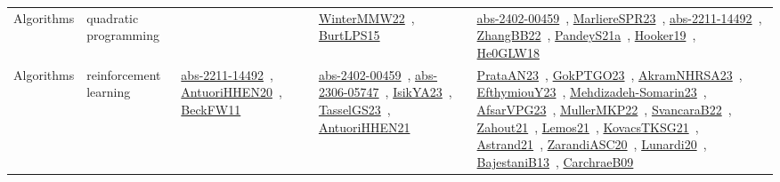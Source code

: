{\begin{longtable}{lp{3cm}>{\raggedright\arraybackslash}p{6cm}>{\raggedright\arraybackslash}p{6cm}>{\raggedright\arraybackslash}p{8cm}}
Algorithms & quadratic programming &  & \href{../works/WinterMMW22.pdf}{WinterMMW22}~\cite{WinterMMW22}, \href{../works/BurtLPS15.pdf}{BurtLPS15}~\cite{BurtLPS15} & \href{../works/abs-2402-00459.pdf}{abs-2402-00459}~\cite{abs-2402-00459}, \href{../works/MarliereSPR23.pdf}{MarliereSPR23}~\cite{MarliereSPR23}, \href{../works/abs-2211-14492.pdf}{abs-2211-14492}~\cite{abs-2211-14492}, \href{../works/ZhangBB22.pdf}{ZhangBB22}~\cite{ZhangBB22}, \href{../works/PandeyS21a.pdf}{PandeyS21a}~\cite{PandeyS21a}, \href{../works/Hooker19.pdf}{Hooker19}~\cite{Hooker19}, \href{../works/He0GLW18.pdf}{He0GLW18}~\cite{He0GLW18}\\
Algorithms & reinforcement learning & \href{../works/abs-2211-14492.pdf}{abs-2211-14492}~\cite{abs-2211-14492}, \href{../works/AntuoriHHEN20.pdf}{AntuoriHHEN20}~\cite{AntuoriHHEN20}, \href{../works/BeckFW11.pdf}{BeckFW11}~\cite{BeckFW11} & \href{../works/abs-2402-00459.pdf}{abs-2402-00459}~\cite{abs-2402-00459}, \href{../works/abs-2306-05747.pdf}{abs-2306-05747}~\cite{abs-2306-05747}, \href{../works/IsikYA23.pdf}{IsikYA23}~\cite{IsikYA23}, \href{../works/TasselGS23.pdf}{TasselGS23}~\cite{TasselGS23}, \href{../works/AntuoriHHEN21.pdf}{AntuoriHHEN21}~\cite{AntuoriHHEN21} & \href{../works/PrataAN23.pdf}{PrataAN23}~\cite{PrataAN23}, \href{../works/GokPTGO23.pdf}{GokPTGO23}~\cite{GokPTGO23}, \href{../works/AkramNHRSA23.pdf}{AkramNHRSA23}~\cite{AkramNHRSA23}, \href{../works/EfthymiouY23.pdf}{EfthymiouY23}~\cite{EfthymiouY23}, \href{../works/Mehdizadeh-Somarin23.pdf}{Mehdizadeh-Somarin23}~\cite{Mehdizadeh-Somarin23}, \href{../works/AfsarVPG23.pdf}{AfsarVPG23}~\cite{AfsarVPG23}, \href{../works/MullerMKP22.pdf}{MullerMKP22}~\cite{MullerMKP22}, \href{../works/SvancaraB22.pdf}{SvancaraB22}~\cite{SvancaraB22}, \href{../works/Zahout21.pdf}{Zahout21}~\cite{Zahout21}, \href{../works/Lemos21.pdf}{Lemos21}~\cite{Lemos21}, \href{../works/KovacsTKSG21.pdf}{KovacsTKSG21}~\cite{KovacsTKSG21}, \href{../works/Astrand21.pdf}{Astrand21}~\cite{Astrand21}, \href{../works/ZarandiASC20.pdf}{ZarandiASC20}~\cite{ZarandiASC20}, \href{../works/Lunardi20.pdf}{Lunardi20}~\cite{Lunardi20}, \href{../works/BajestaniB13.pdf}{BajestaniB13}~\cite{BajestaniB13}, \href{../works/CarchraeB09.pdf}{CarchraeB09}~\cite{CarchraeB09}\\

\end{longtable}}
